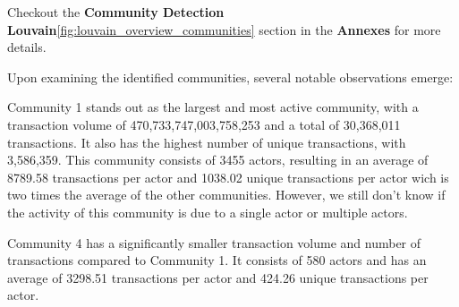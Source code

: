 \documentclass[a4paper, 12pt]{article}
\begin{document}
\begin{table}[!htb]
    \centering
    \caption{Summary of Louvain Community Characteristics}
    \label{tab:louvain_community_summary}
\end{table}

Checkout the \textbf{Community Detection Louvain}\ref{fig:louvain_overview_communities} section in the \textbf{Annexes} for more details.


Upon examining the identified communities, several notable observations emerge:

Community 1 stands out as the largest and most active community, with a transaction volume of 470,733,747,003,758,253 and a total of 30,368,011 transactions.
It also has the highest number of unique transactions, with 3,586,359. This community consists of 3455 actors, resulting in an average of 8789.58 transactions per actor and 1038.02 unique transactions per actor wich is two times the average of the other communities.
However, we still don't know if the activity of this community is due to a single actor or multiple actors.

Community 4 has a significantly smaller transaction volume and number of transactions compared to Community 1. It consists of 580 actors and has an average of 3298.51 transactions per actor and 424.26 unique transactions per actor.
\end{document}
